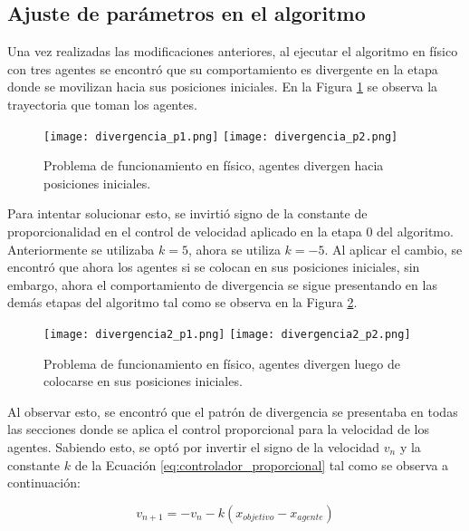 \subsection{Ajuste de parámetros en el algoritmo}
Una vez realizadas las modificaciones anteriores, al ejecutar el algoritmo en físico con tres agentes se encontró que su comportamiento es divergente en la etapa donde se movilizan hacia sus posiciones iniciales. En la Figura \ref{fig:divergencia1} se observa la trayectoria que toman los agentes.

\begin{figure}[H]
	\centering
	\texttt{[image: divergencia\_p1.png]}
	\texttt{[image: divergencia\_p2.png]}
	\caption{Problema de funcionamiento en físico, agentes divergen hacia posiciones iniciales. }
	\label{fig:divergencia1}
\end{figure}

Para intentar solucionar esto, se invirtió signo de la constante de proporcionalidad en el control de velocidad aplicado en la etapa 0 del algoritmo. Anteriormente se utilizaba $k = 5$, ahora se utiliza $k = -5$. Al aplicar el cambio, se encontró que ahora los agentes si se colocan en sus posiciones iniciales, sin embargo, ahora el comportamiento de divergencia se sigue presentando en las demás etapas del algoritmo tal como se observa en la Figura \ref{fig:divergencia2}.

\begin{figure}[H]
	\centering
	\texttt{[image: divergencia2\_p1.png]}
	\texttt{[image: divergencia2\_p2.png]}
	\caption{Problema de funcionamiento en físico, agentes divergen luego de colocarse en sus posiciones iniciales.}
	\label{fig:divergencia2}
\end{figure}

Al observar esto, se encontró que el patrón de divergencia se presentaba en todas las secciones donde se aplica el control proporcional para la velocidad de los agentes. Sabiendo esto, se optó por invertir el signo de la velocidad $v_n$ y la constante $k$ de la Ecuación \ref{eq:controlador_proporcional} tal como se observa a continuación:

\begin{equation}
	v_{n+1} = -v_n - k(x_{objetivo} - x_{agente})
	\label{eq:controlador_proporcional2}
\end{equation}

